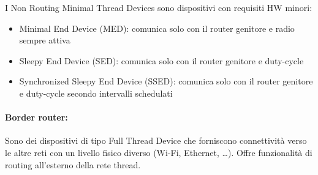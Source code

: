 I Non Routing Minimal Thread Devices sono dispositivi con requisiti HW minori:
\begin{itemize}
	\item Minimal End Device (MED): comunica solo con il router genitore e radio sempre attiva
	\item Sleepy End Device (SED): comunica solo con il router genitore e duty-cycle
	\item Synchronized Sleepy End Device (SSED): comunica solo con il router genitore e duty-cycle secondo intervalli schedulati
\end{itemize}

\paragraph{Border router:} Sono dei dispositivi di tipo Full Thread Device che forniscono connettività verso le altre reti con un livello fisico diverso (Wi-Fi, Ethernet, \dots). Offre funzionalità di routing all'esterno della rete thread.


